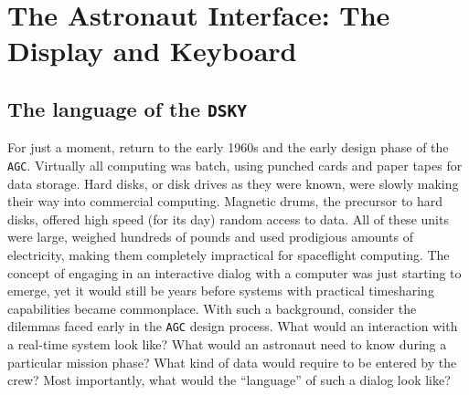 \documentclass[refcap, oxford]{ahsan}
\begin{document}


\iffalse

\section{The Astronaut Interface: The Display and Keyboard}

\subsection{The language of the \texttt{DSKY}}
For just a moment, return to the early 1960s and the early design phase of the \texttt{AGC}. Virtually all computing was batch, using punched cards and paper tapes for data storage. Hard disks, or disk drives as they were known, were slowly making their way into commercial computing. Magnetic drums, the precursor to hard disks, offered high speed (for its day) random access to data. All of these units were large, weighed hundreds of pounds and used prodigious amounts of electricity, making them completely impractical for spaceflight computing. The concept of engaging in an interactive dialog with a computer was just starting to emerge, yet it would still be years before systems with practical timesharing capabilities became commonplace. With such a background, consider the dilemmas faced early in the \texttt{AGC} design process. What would an interaction with a real-time system look like? What would an astronaut need to know during a particular mission phase? What kind of data would require to be entered by the crew? Most importantly, what would the ``language'' of such a dialog look like?

\end{document}
